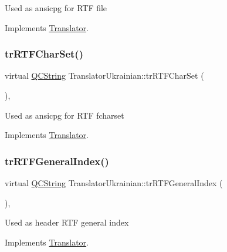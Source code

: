 Used as ansicpg for R\+TF file 

Implements \mbox{\hyperlink{class_translator_a9953a4c0e6a4fc7d017abcd5c2939e0f}{Translator}}.

\mbox{\label{class_translator_ukrainian_a037dd5f67672c74e193979dd3737a69c}} 
\subsubsection{\texorpdfstring{trRTFCharSet()}{trRTFCharSet()}}
{\footnotesize\ttfamily virtual \mbox{\hyperlink{class_q_c_string}{Q\+C\+String}} Translator\+Ukrainian\+::tr\+R\+T\+F\+Char\+Set (\begin{DoxyParamCaption}{ }\end{DoxyParamCaption})\hspace{0.3cm}{\ttfamily [inline]}, {\ttfamily [virtual]}}

Used as ansicpg for R\+TF fcharset 

Implements \mbox{\hyperlink{class_translator_afad391f3cbfb5ce6332b7239f8e2049a}{Translator}}.

\mbox{\label{class_translator_ukrainian_ad508a12789d8e7c3b9ed70f8311ba43e}} 
\subsubsection{\texorpdfstring{trRTFGeneralIndex()}{trRTFGeneralIndex()}}
{\footnotesize\ttfamily virtual \mbox{\hyperlink{class_q_c_string}{Q\+C\+String}} Translator\+Ukrainian\+::tr\+R\+T\+F\+General\+Index (\begin{DoxyParamCaption}{ }\end{DoxyParamCaption})\hspace{0.3cm}{\ttfamily [inline]}, {\ttfamily [virtual]}}

Used as header R\+TF general index 

Implements \mbox{\hyperlink{class_translator}{Translator}}.

\mbox{\label{class_translator_ukrainian_acd55cb201073d78c035f8a8160bb6a8e}} 
